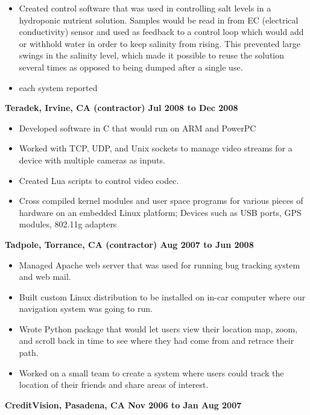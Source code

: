 \documentclass{res}
\begin{document}
\begin{resume}
\begin{itemize}
\item Created control software that was used in controlling salt levels
in a hydroponic nutrient solution.  Samples would be read in from EC
(electrical conductivity) sensor and used as feedback to a control loop
which would add or withhold water in order to keep salinity from rising.
This prevented large swings in the salinity level, which made it possible
to reuse the solution several times as opposed to being dumped after a
single use.

\item each system reported 
\end{itemize}

{\large \bf Teradek, Irvine, CA (contractor) \hfill Jul 2008 to Dec 2008}
\begin{itemize}
\item Developed software in C that would run on ARM and PowerPC
\item Worked with TCP, UDP, and Unix sockets to manage video streams for
a device with multiple cameras as inputs.
\item Created Lua scripts to control video codec.
\item Cross compiled kernel modules and user space programs for various
pieces of hardware on an embedded Linux platform; Devices such as USB
ports, GPS modules, 802.11g adapters
\end{itemize}

{\large \bf Tadpole, Torrance, CA (contractor) \hfill Aug 2007 to Jun 2008}
\begin{itemize}

\item Managed Apache web server that was used for running bug
tracking system and web mail.

\item Built custom Linux distribution to be installed on in-car
computer where our navigation system was going to run.

\item Wrote Python package that would let users view their location
map, zoom, and scroll back in time to see where they had come from
and retrace their path.

\item Worked on a small team to create a system where users could
track the location of their friends and share areas of interest.

\end{itemize}

{\large \bf CreditVision, Pasadena, CA \hfill Nov 2006 to Jan Aug 2007}
\begin{itemize}


\end{itemize}
\end{resume}
\end{document}
